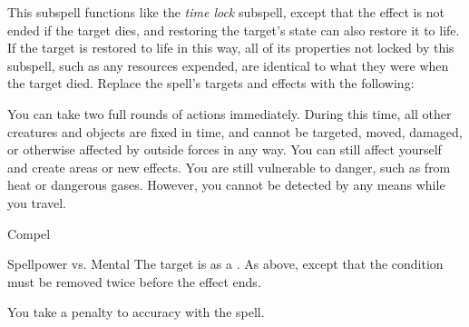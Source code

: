 This subspell functions like the \textit{time lock} subspell, except that the effect is not ended if the target dies, and restoring the target's state can also restore it to life.
If the target is restored to life in this way, all of its properties not locked by this subspell, such as any resources expended, are identical to what they were when the target died.
Replace the spell's targets and effects with the following:
\begin{spellcontent}
\begin{augmenttargetinginfo}
\end{augmenttargetinginfo}
\begin{augmenteffects}
\spelleffect
You can take two full rounds of actions immediately.
During this time, all other creatures and objects are fixed in time, and cannot be targeted, moved, damaged, or otherwise affected by outside forces in any way.
You can still affect yourself and create areas or new effects.
You are still vulnerable to danger, such as from heat or dangerous gases.
However, you cannot be detected by any means while you travel.
\end{augmenteffects}
\end{spellcontent}
\begin{spellsection}{Compel}
\begin{spellheader}
\end{spellheader}
\begin{spellcontent}
\begin{spelltargetinginfo}
\end{spelltargetinginfo}
\begin{spelleffects}
\begin{spellattack}{Spellpower vs. Mental}
\spellsuccess The target is \immobilized as a .
\spellcritical
As above, except that the condition must be removed twice before the effect ends.
\end{spellattack}
\end{spelleffects}
\end{spellcontent}
\begin{spellfooter}
\end{spellfooter}
\begin{spellsubcontent}
\begin{spellcantrip}
You take a  penalty to accuracy with the spell.
\end{spellcantrip}
\end{spellsubcontent}
\end{spellsection}
